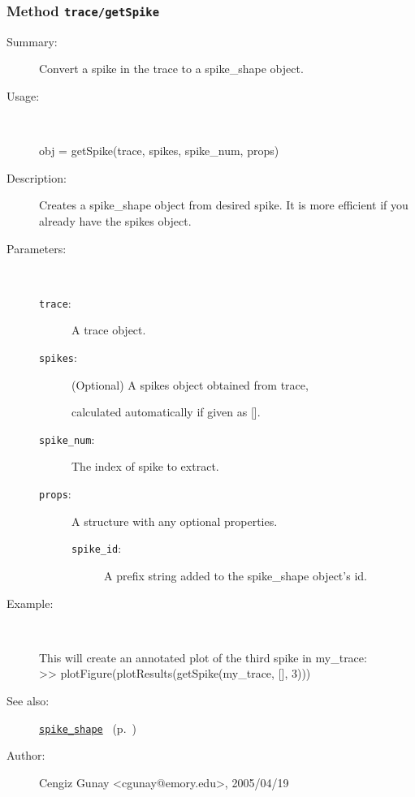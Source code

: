 \subsubsection[Method \texttt{getSpike}]{Method \texttt{trace/getSpike}}%
%
\label{ref_trace__getSpike}%
\hypertarget{ref_trace__getSpike}{}%
\begin{description}
\item[Summary:]Convert a spike in the trace to a spike\_shape object.
%
\item[Usage:]~%
\begin{lyxcode}%
obj = getSpike(trace, spikes, spike\_num, props)
%
\end{lyxcode}%
%
\item[Description:]%
Creates a spike\_shape object from desired spike. It is more efficient if
 you already have the spikes object.
\item[Parameters:]~
\begin{description}%
\item[\texttt{trace}:]
 A trace object.
\item[\texttt{spikes}:]
 (Optional) A spikes object obtained from trace, 

calculated automatically if given as [].
\item[\texttt{spike\_num}:]
 The index of spike to extract.
\item[\texttt{props}:]
 A structure with any optional properties.
\begin{description}%
\item[\texttt{spike\_id}:]
 A prefix string added to the spike\_shape object's id.
\end{description}%
\end{description}%
%
%
\item[Example:]~
\begin{lyxcode} This will create an annotated plot of the third spike in my\_trace:
\\%
 >> plotFigure(plotResults(getSpike(my\_trace, [], 3)))
\\%
\end{lyxcode}
%
\item[See also:]%
\hyperlink{ref_spike_shape}{\texttt{spike\_shape}}%
\ (p.~\pageref{ref_spike_shape})%
%
%
\item[Author:]%
Cengiz Gunay <cgunay@emory.edu>, 2005/04/19
%
\end{description}
\methodline%
